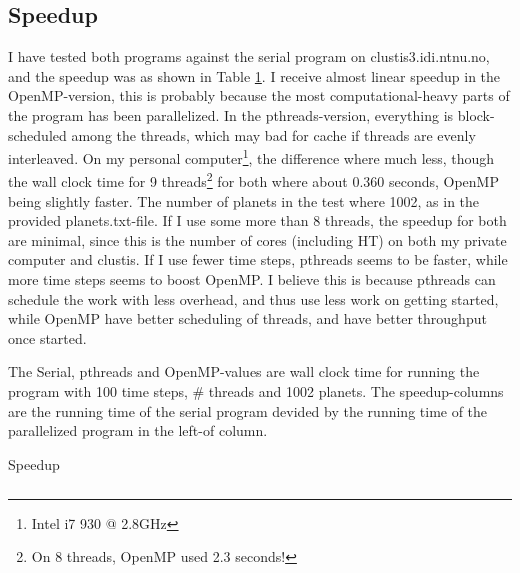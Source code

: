 \documentclass[english,a4paper,numbers=noenddot]{article}
\begin{document}
\subsection{Speedup}
I have tested both programs against the serial program on clustis3.idi.ntnu.no, and the speedup was as shown in Table \ref{speedup}. I receive almost linear speedup in the OpenMP-version, this is probably because the most computational-heavy parts of the program has been parallelized. In the pthreads-version, everything is block-scheduled among the threads, which may bad for cache if threads are evenly interleaved. On my personal computer\footnote{Intel i7 930 @ 2.8GHz}, the difference where much less, though the wall clock time for 9 threads\footnote{On 8 threads, OpenMP used 2.3 seconds!} for both where about 0.360 seconds, OpenMP being slightly faster. The number of planets in the test where 1002, as in the provided planets.txt-file. If I use some more than 8 threads, the speedup for both are minimal, since this is the number of cores (including HT) on both my private computer and clustis. If I use fewer time steps, pthreads seems to be faster, while more time steps seems to boost OpenMP. I believe this is because pthreads can schedule the work with less overhead, and thus use less work on getting started, while OpenMP have better scheduling of threads, and have better throughput once started.

\begin{table}
    The Serial, pthreads and OpenMP-values are wall clock time for running the program with 100 time steps, \# threads and 1002 planets. The speedup-columns are the running time of the serial program devided by the running time of the parallelized program in the left-of column.
    \begin{tabular}{|c|c|c|c|c|c|}
        \hline
        
        \hline
    \end{tabular}
    \caption{Speedup}
    \label{speedup}
\end{table}
\end{document}
